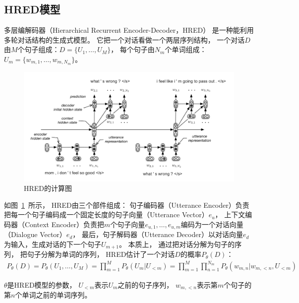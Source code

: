 \subsection{HRED模型}\label{subsec:HRED}
多层编解码器（Hierarchical Recurrent Encoder-Decoder，HRED）
是一种能利用多轮对话结构的生成式模型。
它把一个对话看做一个两层序列结构，
一个对话$D$由$M$个句子组成：$D = \{ U_1, \dots, U_M \}$，
每个句子由$N_m$个单词组成：$U_m = \{ w_{m, 1}, \dots, w_{m, N_m} \}$。
\begin{figure}[H]
    \centering
    \includegraphics[width=\textwidth]{figure/HRED.png}
    \caption{HRED的计算图}
    \label{fig:HRED}
\end{figure}

如图~\ref{fig:HRED}~所示，
HRED由三个部件组成：
句子编码器（Utterance Encoder）负责把每一个句子编码成一个固定长度的句子向量（Utterance Vector）$e_u$，
上下文编码器（Context Encoder）负责把$m$个句子向量$e_{u,1}, \dots, e_{u,m}$编码为一个对话向量（Dialogue Vector）$e_d$，
最后，句子解码器（Utterance Decoder）以对话向量$e_d$为输入，生成对话的下一个句子$U_{m+1}$。
本质上， 通过把对话分解为句子的序列， 把句子分解为单词的序列，
HRED估计了一个对话$D$的概率$P_{\theta}(D)$：
\begin{align}
    P_{\theta}(D) =
    P_{\theta}(U_1, \dots, U_M) = \prod_{m=1}^M P_{\theta}(U_m|U_{<m})
    = \prod_{m=1}^M \prod_{n=1}^{N_m} P_{\theta}( w_{m, n} |w_{m, <n}, U_{<m} )
\end{align}

$\theta$是HRED模型的参数，
$U_{<m}$表示$U_m$之前的句子序列，
$w_{m, <n}$表示第$m$个句子的第$n$个单词之前的单词序列。


